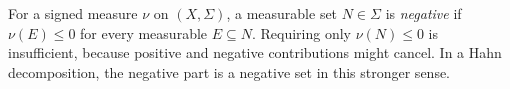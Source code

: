 
For a signed measure $\nu$ on $(X,\Sigma)$, a measurable set $N\in\Sigma$ is \emph{negative} if $\nu(E)\le0$ for every measurable $E\subseteq N$. Requiring only $\nu(N)\le0$ is insufficient, because positive and negative contributions might cancel. In a Hahn decomposition, the negative part is a negative set in this stronger sense.
